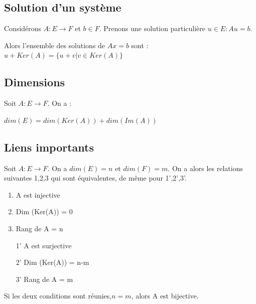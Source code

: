 \documentclass[a4paper]{book}
\begin{document}
\subsection{Solution d'un système}
Considérons $A : E\rightarrow F$ et $b \in F$. Prenons une solution particulière $u \in E : Au = b$. 
\begin{framed}
Alors l'ensemble des solutions de $Ax = b$ sont : $u + Ker(A) = \{u + v | v \in Ker(A)\}$
\end{framed}
\subsection{Dimensions}
Soit $A : E \rightarrow F$. On a :
\begin{framed}
    $dim(E) = dim(Ker(A)) + dim(Im(A))$
\end{framed}
\subsection{Liens importants}
Soit $A : E \rightarrow F$. On a $dim(E) = n$ et $dim(F) = m$. On a alors les relations suivantes 1,2,3 qui sont équivalentes, de même pour 1',2',3'.
\newline \newline
\begin{minipage}{\linewidth}
    \begin{minipage}{.45\linewidth}
    \begin{enumerate}
        \item A est injective
        \item Dim (Ker(A)) = 0
        \item Rang de A = n
    \end{enumerate}
    \end{minipage}
    \begin{minipage}{.45\linewidth}
    \begin{enumerate}
        \item[1'] A est surjective
        \item[2'] Dim (Ker(A)) = n-m
        \item[3'] Rang de A = m
    \end{enumerate}
    \end{minipage}
\end{minipage}
Si les deux conditions sont réunies,$n=m$, alors A est bijective.
\end{document}
